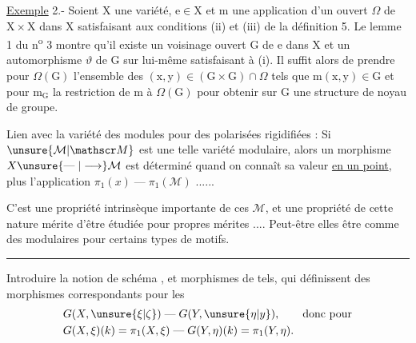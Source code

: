 \uline{Exemple} 2.- Soient $\mathrm X$ une variété, $\mathrm e\in\mathrm X$ et $\mathrm m$ une application d'un ouvert $\Omega$ de $\mathrm X\times\mathrm X$ dans $\mathrm X$ satisfaisant aux conditions (ii) et (iii) de la définition 5. Le lemme 1 du n\textsuperscript{o} 3 montre qu'il existe un voisinage ouvert $\mathrm G$ de $\mathrm e$ dans $\mathrm X$ et un automorphisme $\vartheta$ de $\mathrm G$ sur lui-même satisfaisant à (i). Il suffit alors de prendre pour $\Omega(\mathrm G)$ l'ensemble des $(\mathrm x,\mathrm y)\in(\mathrm G\times\mathrm G)\cap\Omega$ tels que $\mathrm m(\mathrm x,\mathrm y)\in\mathrm G$ et pour $\mathrm m_{\mathrm G}$ la restriction de $\mathrm m$ à $\Omega(\mathrm G)$ pour obtenir sur $\mathrm G$ une structure de noyau de groupe.

Lien avec la variété des modules pour des  polarisées rigidifiées : Si  $\unsure{\mathcal M|\mathscr M}$ est une telle variété modulaire, alors\unsure{,} un morphisme $X\unsure{\mathrel{\text{---}}|\longrightarrow}\mathcal M$ est déterminé quand on connaît sa valeur \uline{en un point}, plus l'application $\pi_1(x)\mathrel{\text{---}}\pi_1(\mathcal M)$ ......

C'est une propriété intrinsèque importante de ces $\mathcal M$, et une propriété de cette nature mérite d'être étudiée pour  propres mérites .... Peut-être  elles  être   comme des   modulaires pour certains types de motifs.

\begin{center}\rule{3cm}{0.5pt}\end{center}

Introduire la notion de schéma   , et morphismes de tels, qui définissent des morphismes correspondants pour les
\[
\begin{aligned}
&G(X,\unsure{\xi|\zeta})\mathrel{\text{---}}G(Y,\unsure{\eta|y}),\qquad\text{donc pour}\\
&G(X,\xi)(k)=\pi_1(X,\xi)\mathrel{\text{---}}G(Y,\eta)(k)=\pi_1(Y,\eta).
\end{aligned}
\]

